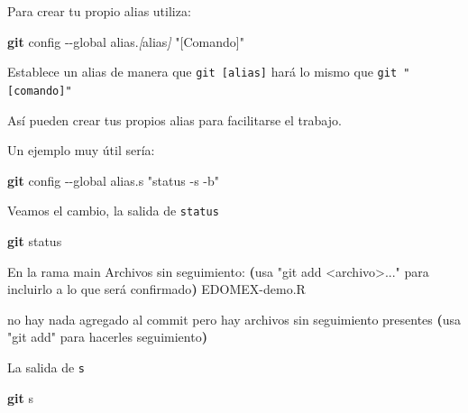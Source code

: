 \documentclass[
]{book}
\newenvironment{Shaded}{\begin{snugshade}}{\end{snugshade}}
\newcommand{\AttributeTok}[1]{\textcolor[rgb]{0.13,0.29,0.53}{#1}}
\newcommand{\ErrorTok}[1]{\textcolor[rgb]{0.64,0.00,0.00}{\textbf{#1}}}
\newcommand{\ExtensionTok}[1]{#1}
\newcommand{\FunctionTok}[1]{\textcolor[rgb]{0.13,0.29,0.53}{\textbf{#1}}}
\newcommand{\KeywordTok}[1]{\textcolor[rgb]{0.13,0.29,0.53}{\textbf{#1}}}
\newcommand{\NormalTok}[1]{#1}
\newcommand{\PreprocessorTok}[1]{\textcolor[rgb]{0.56,0.35,0.01}{\textit{#1}}}
\newcommand{\SpecialStringTok}[1]{\textcolor[rgb]{0.31,0.60,0.02}{#1}}
\newcommand{\StringTok}[1]{\textcolor[rgb]{0.31,0.60,0.02}{#1}}
\begin{document}
Para crear tu propio alias utiliza:

\begin{Shaded}
\begin{Highlighting}[]
\FunctionTok{git}\NormalTok{ config }\AttributeTok{{-}{-}global}\NormalTok{ alias.}\PreprocessorTok{[}\SpecialStringTok{alias}\PreprocessorTok{]} \StringTok{"[Comando]"}
\end{Highlighting}
\end{Shaded}

Establece un alias de manera que \texttt{git\ {[}alias{]}} hará lo mismo que \texttt{git\ "{[}comando{]}"}

Así pueden crear tus propios alias para facilitarse el trabajo.

Un ejemplo muy útil sería:

\begin{Shaded}
\begin{Highlighting}[]
\FunctionTok{git}\NormalTok{ config }\AttributeTok{{-}{-}global}\NormalTok{ alias.s }\StringTok{"status {-}s {-}b"}
\end{Highlighting}
\end{Shaded}

Veamos el cambio, la salida de \texttt{status}

\begin{Shaded}
\begin{Highlighting}[]
\FunctionTok{git}\NormalTok{ status}
\end{Highlighting}
\end{Shaded}

\begin{Shaded}
\begin{Highlighting}[]
\ExtensionTok{En}\NormalTok{ la rama main}
\ExtensionTok{Archivos}\NormalTok{ sin seguimiento:}
  \KeywordTok{(}\ExtensionTok{usa} \StringTok{"git add \textless{}archivo\textgreater{}..."}\NormalTok{ para incluirlo a lo que será confirmado}\KeywordTok{)}
    \ExtensionTok{EDOMEX{-}demo.R}

\ExtensionTok{no}\NormalTok{ hay nada agregado al commit pero hay archivos sin seguimiento presentes }\ErrorTok{(}\ExtensionTok{usa} \StringTok{"git add"}\NormalTok{ para hacerles seguimiento}\KeywordTok{)}
\end{Highlighting}
\end{Shaded}

La salida de \texttt{s}

\begin{Shaded}
\begin{Highlighting}[]
\FunctionTok{git}\NormalTok{ s}
\end{Highlighting}
\end{Shaded}
\end{document}
